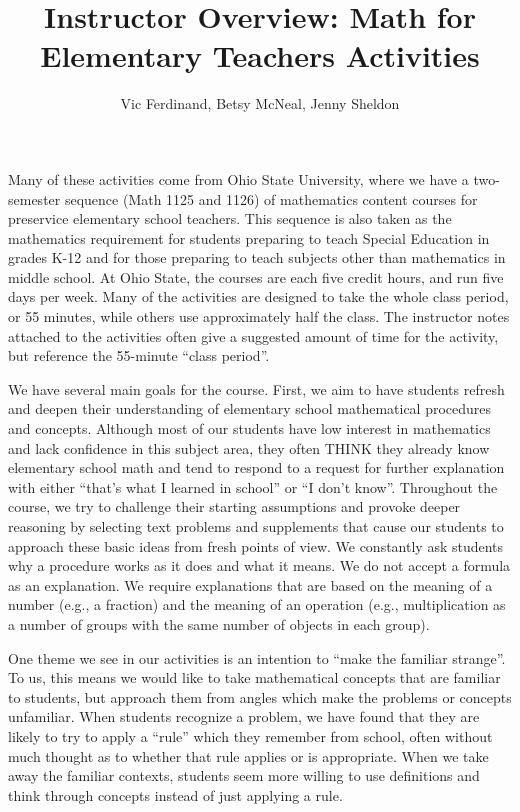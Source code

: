 \documentclass[nooutcomes]{ximera}
\title{Instructor Overview: Math for Elementary Teachers Activities}
\author{Vic Ferdinand, Betsy McNeal, Jenny Sheldon}
\begin{document}
\begin{abstract}\end{abstract}\maketitle

Many of these activities come from Ohio State University, where we have a two-semester sequence 
(Math 1125 and 1126) of mathematics content courses for preservice elementary school teachers.  This sequence is
also taken as the mathematics requirement for students preparing 
to teach Special Education in grades K-12 and for those preparing to teach subjects other than 
mathematics in middle school.  At Ohio State, the courses are each five credit 
hours, and run five days per week.  Many of the activities are designed to take the whole class 
period, or 55 minutes, while others use approximately half the class.  
The instructor notes attached to the activities often give a suggested amount of time for the 
activity, but reference the 55-minute ``class period''.


We have several main goals for the course.  First, we aim to have students refresh and deepen their 
understanding of elementary school mathematical procedures and concepts.  Although most of our 
students have low interest in mathematics and lack confidence in this subject area, they often 
THINK they already know elementary school math and tend to respond to a request 
for further explanation with either ``that's what I learned in school'' or ``I don't know''.  Throughout the 
course, we try to challenge their starting assumptions and provoke deeper reasoning by selecting 
text problems and supplements that cause our students to approach these basic ideas from fresh 
points of view.  We constantly ask students why a procedure works as it does and what it 
means.  We do not accept a formula as an explanation.  We require explanations that are
based on the meaning of a number (e.g., a fraction) and the meaning of an operation (e.g., 
multiplication as a number of groups with the same number of objects in each group).

One theme we see in our activities is an intention to ``make the familiar strange''.  To us, this means 
we would like to take mathematical concepts that are familiar to students, but approach them from 
angles which make the problems or concepts unfamiliar.  When students recognize a problem, we have 
found that they are likely to try to apply a ``rule'' which they remember from school, often 
without much thought as to whether that rule applies or is appropriate.  When we take away the 
familiar contexts, students seem more willing to use definitions and think through concepts instead
of just applying a rule.
\end{document}
